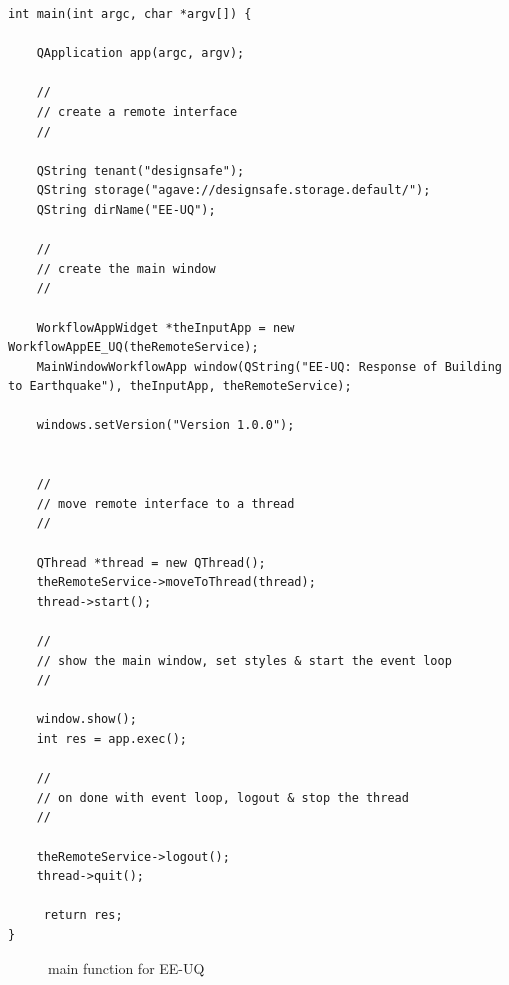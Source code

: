 \begin{verbatim}
int main(int argc, char *argv[]) {

    QApplication app(argc, argv);
 
    //                                                                       
    // create a remote interface                                             
    //                                                                       

    QString tenant("designsafe");
    QString storage("agave://designsafe.storage.default/");
    QString dirName("EE-UQ");
    
    //                                                                       
    // create the main window                                                
    // 
    
    WorkflowAppWidget *theInputApp = new WorkflowAppEE_UQ(theRemoteService);
    MainWindowWorkflowApp window(QString("EE-UQ: Response of Building to Earthquake"), theInputApp, theRemoteService);
    
    windows.setVersion("Version 1.0.0");


    //                                                                       
    // move remote interface to a thread                                     
    //                                                                       

    QThread *thread = new QThread();
    theRemoteService->moveToThread(thread); 
    thread->start();

    //                                                                       
    // show the main window, set styles & start the event loop               
    //                                                                       

    window.show(); 
    int res = app.exec();

    //                                                                       
    // on done with event loop, logout & stop the thread                     
    //                                                                       

    theRemoteService->logout();
    thread->quit();
    
     return res;
}
 \end{verbatim}
 \begin{figure}
  \caption{main function for EE-UQ}
  \label{fig:mainCode}
 \end{figure}

